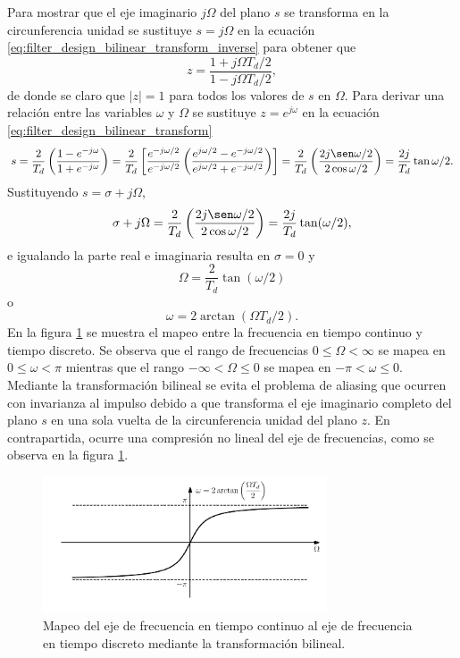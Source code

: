 \documentclass[a4paper]{report}
\begin{document}
Para mostrar que el eje imaginario \(j\Omega\) del plano \(s\) se transforma en la circunferencia unidad se sustituye \(s=j\Omega\) en la ecuación \ref{eq:filter_design_bilinear_transform_inverse} para obtener que
\[
 z=\frac{1+j\Omega T_d/2}{1-j\Omega T_d/2}, 
\]
de donde se claro que \(|z|=1\) para todos los valores de \(s\) en \(\Omega\). Para derivar una relación entre las variables \(\omega\) y \(\Omega\) se sustituye \(z=e^{j\omega}\) en la ecuación \ref{eq:filter_design_bilinear_transform}
\[
 s=\frac{2}{T_d}\left(\frac{1-e^{-j\omega}}{1+e^{-j\omega}}\right)
  =\frac{2}{T_d}\left[\frac{e^{-j\omega/2}}{e^{-j\omega/2}}\left(\frac{e^{j\omega/2}-e^{-j\omega/2}}{e^{j\omega/2}+e^{-j\omega/2}}\right)\right]
   =\frac{2}{T_d}\left(\frac{2j\sen\omega/2}{2\cos\omega/2}\right)=\frac{2j}{T_d}\tan\omega/2.
\]
Sustituyendo \(s=\sigma+j\Omega\),
\[
 \sigma+j\Omega=\frac{2}{T_d}\left(\frac{2j\sen\omega/2}{2\cos\omega/2}\right)=\frac{2j}{T_d}\tan(\omega/2),
\]
e igualando la parte real e imaginaria resulta en \(\sigma=0\) y 
\begin{equation}\label{eq:filter_design_bilinear_transform_Omega}
 \Omega=\frac{2}{T_d}\tan(\omega/2) 
\end{equation}
o
\begin{equation}\label{eq:filter_design_bilinear_transform_omega}
 \omega=2\arctan(\Omega T_d/2). 
\end{equation}
En la figura \ref{fig:filter_design_bilinear_frequency_mapping} se muestra el mapeo entre la frecuencia en tiempo continuo y tiempo discreto. Se observa que el rango de frecuencias \(0\leq\Omega<\infty\) se mapea en \(0\leq\omega<\pi\) mientras que el rango \(-\infty<\Omega\leq0\) se mapea en \(-\pi<\omega\leq0\). Mediante la transformación bilineal se evita el problema de aliasing que ocurren con invarianza al impulso debido a que transforma el eje imaginario completo del plano \(s\) en una sola vuelta de la circunferencia unidad del plano \(z\). En contrapartida, ocurre una compresión no lineal del eje de frecuencias, como se observa en la figura \ref{fig:filter_design_bilinear_frequency_mapping}.
\begin{figure}[!htb]
 \begin{center}
 \includegraphics[width=0.75\textwidth]{figuras/filter_design_bilinear_frequency_mapping.pdf}
 \caption{\label{fig:filter_design_bilinear_frequency_mapping} Mapeo del eje de frecuencia en tiempo continuo al eje de frecuencia en tiempo discreto mediante la transformación bilineal.}
 \end{center}
\end{figure}
\end{document}
